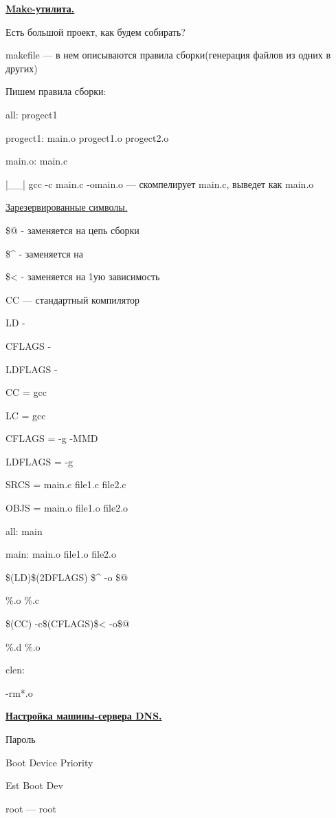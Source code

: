 \par 
\underline{\textbf{Make-утилита.}}
\par 
Есть большой проект, как будем собирать?
\par 
makefile — в нем описываются правила
сборки(генерация файлов из одних в
других)
\par 
Пишем правила сборки:
\par 
all: progect1
\par 
progect1: main.o progect1.o progect2.o
\par 
main.o: main.c
\par 
|\_\_| gcc -c main.c -omain.o — скомпелирует main.c,
выведет как main.o
\par 
\underline{Зарезервированные символы.}
\par 
\$@ - заменяется на цепь сборки
\par 
\$\^{} -  заменяется на 

\par 
\$< - заменяется на 1ую зависимость
\par 
CC — стандартный компилятор
\par 
LD -
\par 
CFLAGS -
\par 
LDFLAGS -
\par 
CC = gcc
\par 
LC = gcc
\par 
CFLAGS = -g -MMD
\par 
LDFLAGS = -g
\par 
SRCS = main.c file1.c file2.c
\par 
OBJS = main.o file1.o file2.o
\par 
all: main
\par 
main: main.o file1.o file2.o
\par 
\$(LD)\$(2DFLAGS) \$\^{} -o \$@
\par 
\%.o \%.c
\par 
\$(CC) -c\$(CFLAGS)\$< -o\$@
\par 
\%.d \%.o
\par 
clen:
\par 
	-rm*.o
\par 
\underline{\textbf{Настройка машины-сервера DNS.}}
\par 
Пароль
\par 
Boot Device Priority
\par 
Est Boot Dev
\par 
root — root 

